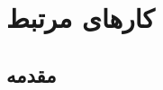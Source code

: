 
\chapter{کارهای مرتبط} \label{ch:related}
\thispagestyle{empty}


\section{مقدمه}
\label{sec:intro}
\paragraph{}
{
}


